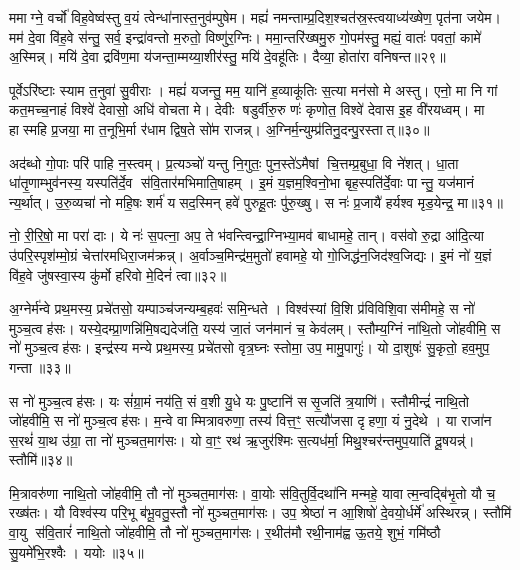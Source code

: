 ममाग्ने॒ वर्चो॑ विह॒वेष्व॑स्तु व॒यं त्वेन्धा॑नास्त॒नुव॑म्पुषेम। मह्यं॑ नमन्ताम्प्र॒दिश॒श्चत॑स्र॒स्त्वयाध्य॑ख्षेण॒ पृत॑ना जयेम। मम॑ दे॒वा वि॑ह॒वे स॑न्तु॒ सर्व॒ इन्द्रा॑वन्तो म॒रुतो॒ विष्णु॑र॒ग्निः। ममा॒न्तरि॑ख्षमु॒रु गो॒पम॑स्तु॒ मह्यं॒ वातः॑ पवतां॒ कामे॑ अ॒स्मिन्न्। मयि॑ दे॒वा द्रवि॑ण॒मा य॑जन्ता॒म्मय्या॒शीर॑स्तु॒ मयि॑ दे॒वहू॑तिः। दैव्या॒ होता॑रा वनिषन्त॥२९॥

पूर्वेऽरि॑ष्टाः स्याम त॒नुवा॑ सु॒वीराः। मह्यं॑ यजन्तु॒ मम॒ यानि॑ ह॒व्याकू॑तिः स॒त्या मन॑सो मे अस्तु। एनो॒ मा नि गां कत॒मच्च॒नाहं विश्वे॑ देवासो॒ अधि॑ वोचता मे। देवीः षडुर्वीरु॒रु णः॑ कृणोत॒ विश्वे॑ देवास इ॒ह वी॑रयध्वम्। मा हास्महि प्र॒जया॒ मा त॒नूभि॒र्मा र॑धाम द्विष॒ते सो॑म राजन्न्। अ॒ग्निर्म॒न्युम्प्र॑तिनु॒दन्पु॒रस्तात्॥३०॥

अद॑ब्धो गो॒पाः परि॑ पाहि न॒स्त्वम्। प्र॒त्यञ्चो॑ यन्तु नि॒गुतः॒ पुन॒स्ते॑ऽमैषां चि॒त्तम्प्र॒बुधा॒ वि ने॑शत्। धा॒ता धा॑तृ॒णाम्भुव॑नस्य॒ यस्पति॑र्दे॒व स॑वि॒तार॑मभिमाति॒षाहम्। इ॒मं य॒ज्ञम॒श्विनो॒भा बृह॒स्पति॑र्दे॒वाः पान्तु॒ यज॑मानं न्य॒र्थात्। उ॒रु॒व्यचा॑ नो महि॒षः शर्म॑ यसद॒स्मिन् हवे॑ पुरुहू॒तः पु॑रु॒ख्षु। स नः॑ प्र॒जायै॑ हर्यश्व मृड॒येन्द्र॒ मा॥३१॥

नो॒ री॒रि॒षो॒ मा परा॑ दाः। ये नः॑ स॒पत्ना॒ अप॒ ते भ॑वन्त्विन्द्रा॒ग्निभ्या॒मव॑ बाधामहे॒ तान्। वस॑वो रु॒द्रा आ॑दि॒त्या उ॑परि॒स्पृश॑म्मो॒ग्रं चेत्ता॑रमधिरा॒जम॑क्रन्न्। अ॒र्वाञ्च॒मिन्द्र॑म॒मुतो॑ हवामहे॒ यो गो॒जिद्ध॑न॒जिद॑श्व॒जिद्यः। इ॒मं नो॑ य॒ज्ञं वि॑ह॒वे जु॑षस्वा॒स्य कु॑र्मो हरिवो मे॒दिनं॑ त्वा॥३२॥

{\anuvakamend[{व॒नि॒ष॒न्त॒ पु॒रस्ता॒न्मा त्रिच॑त्वारिशच्च॥14॥}]}

अ॒ग्नेर्म॑न्वे प्रथ॒मस्य॒ प्रचे॑तसो॒ यम्पाञ्च॑जन्यम्ब॒हवः॑ समि॒न्धते। विश्व॑स्यां वि॒शि प्र॑विविशि॒वास॑मीमहे॒ स नो॑ मुञ्च॒त्वह॑सः। यस्ये॒दम्प्रा॒णन्नि॑मि॒षद्यदेज॑ति॒ यस्य॑ जा॒तं जन॑मानं च॒ केव॑लम्। स्तौम्य॒ग्निं ना॑थि॒तो जो॑हवीमि॒ स नो॑ मुञ्च॒त्वह॑सः। इन्द्र॑स्य मन्ये प्रथ॒मस्य॒ प्रचे॑तसो वृत्र॒घ्नः स्तोमा॒ उप॒ मामु॒पागुः॑। यो दा॒शुषः॑ सु॒कृतो॒ हव॒मुप॒ गन्ता॥३३॥

स नो॑ मुञ्च॒त्वह॑सः। यः सं॑ग्रा॒मं नय॑ति॒ सं व॒शी यु॒धे यः पु॒ष्टानि॑ ससृ॒जति॑ त्र॒याणि॑। स्तौमीन्द्रं॑ नाथि॒तो जो॑हवीमि॒ स नो॑ मुञ्च॒त्वह॑सः। म॒न्वे वाम्मित्रावरुणा॒ तस्य॑ वित्त॒ꣳ॒ सत्यौ॑जसा दृहणा॒ यं नु॒देथे। या राजा॑न स॒रथं॑ या॒थ उ॑ग्रा॒ ता नो॑ मुञ्चत॒माग॑सः। यो वा॒ꣳ॒ रथ॑ ऋ॒जुर॑श्मिः स॒त्यध॑र्मा॒ मिथु॒श्चर॑न्तमुप॒याति॑ दू॒षयन्न्॑। स्तौमि॑॥३४॥

मि॒त्रावरु॑णा नाथि॒तो जो॑हवीमि॒ तौ नो॑ मुञ्चत॒माग॑सः। वा॒योः स॑वि॒तुर्वि॒दथा॑नि मन्महे॒ यावात्म॒न्वद्बि॑भृ॒तो यौ च॒ रख्ष॑तः। यौ विश्व॑स्य परि॒भू ब॑भू॒वतु॒स्तौ नो॑ मुञ्चत॒माग॑सः। उप॒ श्रेष्ठा॑ न आ॒शिषो॑ दे॒वयो॒र्धर्मे॑ अस्थिरन्न्। स्तौमि॑ वा॒यु स॑वि॒तारं॑ नाथि॒तो जो॑हवीमि॒ तौ नो॑ मुञ्चत॒माग॑सः। र॒थीत॑मौ रथी॒नाम॑ह्व ऊ॒तये॒ शुभं॒ गमि॑ष्ठौ सु॒यमे॑भि॒रश्वैः। ययोः॥३५॥

